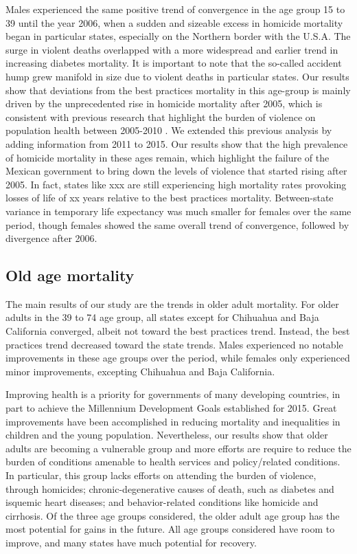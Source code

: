 \documentclass{article}
\begin{document}
\begin{spacing}{1.5}
Males experienced the same positive trend of convergence in the age group 15 to
39 until the year 2006, when a sudden and sizeable excess in homicide mortality
began in particular states, especially on the Northern border with the U.S.A.
The surge in violent deaths overlapped with a more widespread and earlier
trend in increasing diabetes mortality. It is important to note that the
so-called accident hump grew manifold in size due to violent deaths in
particular states. Our results show that deviations from the best practices mortality in this age-group is mainly driven by the unprecedented rise in homicide mortality after 2005, which is consistent with previous research that highlight the burden of violence on population health between 2005-2010 \citep{Aburto2015}. We extended this previous analysis by adding information from 2011 to 2015. Our results show that the high prevalence of homicide mortality in these ages remain, which highlight the failure of the Mexican government to bring down the levels of violence that started rising after 2005. In fact, states like xxx are still experiencing high mortality rates provoking losses of life of xx years relative to the best practices mortality. Between-state variance in temporary life expectancy was much smaller for females over the same period, though females showed the same overall trend of convergence, followed by
divergence after 2006.

\subsection*{Old age mortality}
The main results of our study are the trends in older adult mortality.
For older adults in the 39 to 74 age group, all states except for Chihuahua and
Baja California converged, albeit not toward the best practices trend. Instead,
the best practices trend decreased toward the state trends. Males experienced no
notable improvements in these age groups over the period, while females only
experienced minor improvements, excepting Chihuahua and
Baja California. 

Improving health is a priority for governments of many developing countries, in part to achieve the Millennium Development Goals established for 2015.  Great improvements have been accomplished in reducing mortality and inequalities in children and the young population. Nevertheless, our results show that older adults are becoming a vulnerable group and more efforts are require to reduce the burden of conditions amenable to health services and policy/related conditions. In particular, this group lacks efforts on attending the burden of violence, through homicides; chronic-degenerative
causes of death, such as diabetes and isquemic heart diseases; and behavior-related conditions like homicide and cirrhosis. Of the three age groups considered, the older adult age group
has the most potential for gains in the future. All age groups considered have
room to improve, and many states have much potential for recovery.



\end{spacing}
\end{document}
